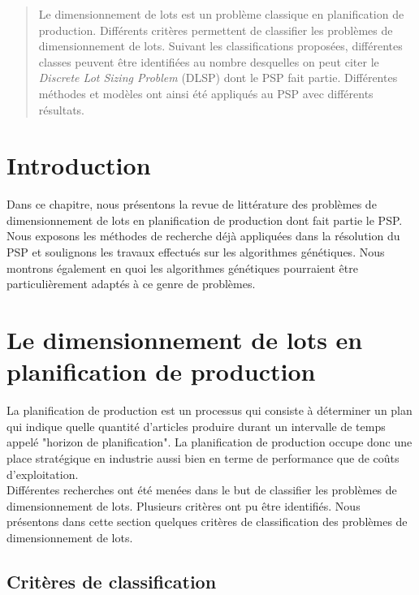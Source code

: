 \begin{abstract}
	Le dimensionnement de lots est un problème classique en planification de production. Différents critères \cite{cathy} permettent de classifier les problèmes de dimensionnement de lots. Suivant les classifications proposées, différentes classes peuvent être identifiées au nombre desquelles on peut citer le \emph{Discrete Lot Sizing Problem} (DLSP) dont le PSP fait partie. Différentes méthodes et modèles ont ainsi été appliqués au PSP \cite{ratheil_master} \cite{ceschia} avec différents résultats.
\end{abstract}

\section*{Introduction}
		
		Dans ce chapitre, nous présentons la revue de littérature des problèmes de dimensionnement de lots en planification de production dont fait partie le PSP. Nous exposons les méthodes de recherche déjà appliquées dans la résolution du PSP et soulignons les travaux effectués sur les algorithmes génétiques. Nous montrons également en quoi les algorithmes génétiques pourraient être particulièrement adaptés à ce genre de problèmes.
		
	\section{Le dimensionnement de lots en planification de production}
	La planification de production est un processus qui consiste à déterminer un plan qui indique quelle quantité d'articles produire durant un intervalle de temps appelé "horizon de planification". La planification de production occupe donc une place stratégique en industrie aussi bien en terme de performance que de coûts d'exploitation.\\
	\hspace*{.5cm} Différentes recherches \cite{dauzere} ont été menées dans le but de classifier les problèmes de dimensionnement de lots. Plusieurs critères ont pu être identifiés. Nous présentons dans cette section quelques critères de classification \cite{cathy} des problèmes de dimensionnement de lots.
	
\subsection{Critères de classification}

